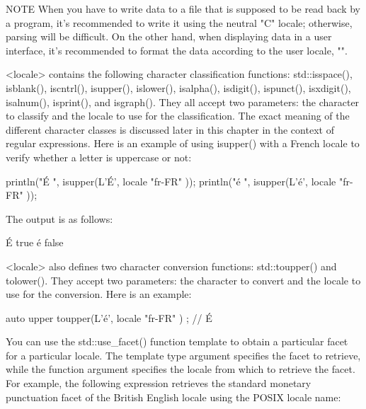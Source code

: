\begin{myNotic}{NOTE}
When you have to write data to a file that is supposed to be read back by a program, it’s recommended to write it using the neutral "C" locale; otherwise, parsing will be difficult. On the other hand, when displaying data in a user interface, it’s recommended to format the data according to the user locale, "".
\end{myNotic}


<locale> contains the following character classification functions: std::isspace(), isblank(), iscntrl(), isupper(), islower(), isalpha(), isdigit(), ispunct(), isxdigit(), isalnum(), isprint(), and isgraph(). They all accept two parameters: the character to classify and the locale to use for the classification. The exact meaning of the different character classes is discussed later in this chapter in the context of regular expressions. Here is an example of using isupper() with a French locale to verify whether a letter is uppercase or not:

\begin{cpp}
println("É {}", isupper(L'É', locale{ "fr-FR" }));
println("é {}", isupper(L'é', locale{ "fr-FR" }));
\end{cpp}

The output is as follows:

\begin{shell}
É true
é false
\end{shell}


<locale> also defines two character conversion functions: std::toupper() and tolower(). They accept two parameters: the character to convert and the locale to use for the conversion. Here is an example:

\begin{cpp}
auto upper { toupper(L'é', locale { "fr-FR" }) }; // É
\end{cpp}


You can use the std::use\_facet() function template to obtain a particular facet for a particular locale. The template type argument specifies the facet to retrieve, while the function argument specifies the locale from which to retrieve the facet. For example, the following expression retrieves the standard monetary punctuation facet of the British English locale using the POSIX locale name:

